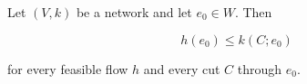 Let $(V, k)$ be a network and let $e_0 \in W$. Then

$$h(e_0) \leq k(C; e_0)$$

for every feasible flow $h$ and every cut $C$ through $e_0$.
